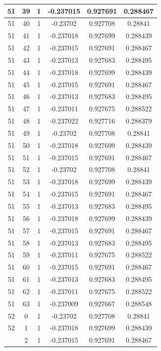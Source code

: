 \documentclass[12pt,a4paper]{article}
\numberwithin{equation}{section}
\numberwithin{figure}{section}
\numberwithin{table}{section}
\begin{document}
\begin{longtable}{|c|c|c|c|c|c|}
51 & 39 & 1 & -0.237015 & 0.927691 & 0.288467 \\ \hline
51 & 40 & 1 & -0.23702 & 0.927708 & 0.28841 \\ \hline
51 & 41 & 1 & -0.237018 & 0.927699 & 0.288439 \\ \hline
51 & 42 & 1 & -0.237015 & 0.927691 & 0.288467 \\ \hline
51 & 43 & 1 & -0.237013 & 0.927683 & 0.288495 \\ \hline
51 & 44 & 1 & -0.237018 & 0.927699 & 0.288439 \\ \hline
51 & 45 & 1 & -0.237015 & 0.927691 & 0.288467 \\ \hline
51 & 46 & 1 & -0.237013 & 0.927683 & 0.288495 \\ \hline
51 & 47 & 1 & -0.237011 & 0.927675 & 0.288522 \\ \hline
51 & 48 & 1 & -0.237022 & 0.927716 & 0.288379 \\ \hline
51 & 49 & 1 & -0.23702 & 0.927708 & 0.28841 \\ \hline
51 & 50 & 1 & -0.237018 & 0.927699 & 0.288439 \\ \hline
51 & 51 & 1 & -0.237015 & 0.927691 & 0.288467 \\ \hline
51 & 52 & 1 & -0.23702 & 0.927708 & 0.28841 \\ \hline
51 & 53 & 1 & -0.237018 & 0.927699 & 0.288439 \\ \hline
51 & 54 & 1 & -0.237015 & 0.927691 & 0.288467 \\ \hline
51 & 55 & 1 & -0.237013 & 0.927683 & 0.288495 \\ \hline
51 & 56 & 1 & -0.237018 & 0.927699 & 0.288439 \\ \hline
51 & 57 & 1 & -0.237015 & 0.927691 & 0.288467 \\ \hline
51 & 58 & 1 & -0.237013 & 0.927683 & 0.288495 \\ \hline
51 & 59 & 1 & -0.237011 & 0.927675 & 0.288522 \\ \hline
51 & 60 & 1 & -0.237015 & 0.927691 & 0.288467 \\ \hline
51 & 61 & 1 & -0.237013 & 0.927683 & 0.288495 \\ \hline
51 & 62 & 1 & -0.237011 & 0.927675 & 0.288522 \\ \hline
51 & 63 & 1 & -0.237009 & 0.927667 & 0.288548 \\ \hline
52 & 0 & 1 & -0.23702 & 0.927708 & 0.28841 \\ \hline
52 & 1 & 1 & -0.237018 & 0.927699 & 0.288439 \\ \hline
\pagebreak
52 & 2 & 1 & -0.237015 & 0.927691 & 0.288467 \\ \hline

\end{longtable}
\end{document}
